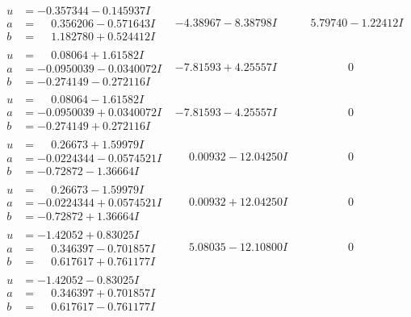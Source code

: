 \documentclass[1p]{elsarticle_modified}
\theoremstyle{definition}
\begin{document}
$$\begin{array}{c|c|c}
\begin{aligned}
u &= -0.357344 - 0.145937 I \\
a &= \phantom{-}0.356206 - 0.571643 I \\
b &= \phantom{-}1.182780 + 0.524412 I\end{aligned}
 & -4.38967 - 8.38798 I & \phantom{-}5.79740 - 1.22412 I \\ \hline\begin{aligned}
u &= \phantom{-}0.08064 + 1.61582 I \\
a &= -0.0950039 - 0.0340072 I \\
b &= -0.274149 - 0.272116 I\end{aligned}
 & -7.81593 + 4.25557 I & \phantom{-0.000000 } 0 \\ \hline\begin{aligned}
u &= \phantom{-}0.08064 - 1.61582 I \\
a &= -0.0950039 + 0.0340072 I \\
b &= -0.274149 + 0.272116 I\end{aligned}
 & -7.81593 - 4.25557 I & \phantom{-0.000000 } 0 \\ \hline\begin{aligned}
u &= \phantom{-}0.26673 + 1.59979 I \\
a &= -0.0224344 - 0.0574521 I \\
b &= -0.72872 - 1.36664 I\end{aligned}
 & \phantom{-}0.00932 - 12.04250 I & \phantom{-0.000000 } 0 \\ \hline\begin{aligned}
u &= \phantom{-}0.26673 - 1.59979 I \\
a &= -0.0224344 + 0.0574521 I \\
b &= -0.72872 + 1.36664 I\end{aligned}
 & \phantom{-}0.00932 + 12.04250 I & \phantom{-0.000000 } 0 \\ \hline\begin{aligned}
u &= -1.42052 + 0.83025 I \\
a &= \phantom{-}0.346397 - 0.701857 I \\
b &= \phantom{-}0.617617 + 0.761177 I\end{aligned}
 & \phantom{-}5.08035 - 12.10800 I & \phantom{-0.000000 } 0 \\ \hline\begin{aligned}
u &= -1.42052 - 0.83025 I \\
a &= \phantom{-}0.346397 + 0.701857 I \\
b &= \phantom{-}0.617617 - 0.761177 I\end{aligned}

\end{array}$$
\end{document}
